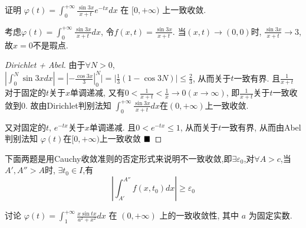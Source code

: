 \documentclass[lang=cn,newtx,10pt,scheme=chinese]{elegantbook}
\begin{document}
\begin{example}[$\bigstar$]
证明 $\varphi(t) = \int_{0}^{+\infty} \frac{\sin 3x}{x+t} e^{-tx} dx$ 在 $[0, +\infty)$ 上一致收敛.
\end{example}

\begin{remark}
    考虑$\varphi(t) = \int_{0}^{+\infty} \frac{\sin 3x}{x+t} dx$, 令$f(x,t) = \frac{\sin 3x}{x+t}$. 当$(x,t) \to (0,0)$时, $\frac{\sin 3x}{x+t} \to 3$, 故$x=0$不是瑕点.
\end{remark}

\begin{proof}[Dirichlet + Abel]
由于$\forall N > 0$, $|\int_{0}^{N} \sin 3x dx| = |-\frac{\cos 3x}{3}|_{0}^{N}| = |\frac{1}{3}(1-\cos 3N)| \le \frac{2}{3}$, 从而关于$t$一致有界.
且$\frac{1}{x+t}$对于固定的$t$关于$x$单调递减, 又有$0 < \frac{1}{x+t} < \frac{1}{x} \to 0 (x \to \infty)$, 即$\frac{1}{x+t}$关于$t$一致收敛到$0$.
故由Dirichlet判别法知 $\int_{0}^{+\infty} \frac{\sin 3x}{x+t} dx$在$(0, +\infty)$上一致收敛.

又对固定的$t$, $e^{-tx}$关于$x$单调递减. 且$0 < e^{-tx} \le 1$, 从而关于$t$一致有界, 从而由Abel判别法知
$\varphi(t)$在$[0, +\infty)$上一致收敛
$\hfill \blacksquare$
\end{proof}

下面两题是用Cauchy收敛准则的否定形式来说明不一致收敛,即$\exists \varepsilon_0$,对$\forall A > c$,当$A',A'' > A$时, $\exists t_0 \in I$,有
$$
|\int_{A'}^{A''}f(x,t_0)dx| \ge \varepsilon_0
$$ 
\begin{example}[$\bigstar$]
讨论 $\varphi(t) = \int_{1}^{+\infty} \frac{x \sin tx}{a^2 + x^2} dx$ 在 $(0, +\infty)$ 上的一致收敛性, 其中 $a$ 为固定实数.
\end{example}
\end{document}
